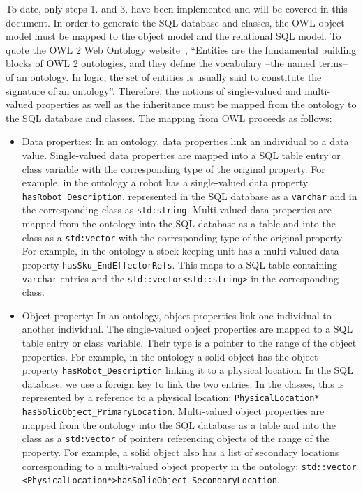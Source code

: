To date, only steps 1. and 3. have been implemented and will be covered in this document. In order to generate the SQL database and {\cpp} classes, the OWL object model must be mapped to the {\cpp} object model and the relational SQL model.  To quote the OWL 2 Web Ontology website~\cite{OWLspec}, ``Entities are the fundamental building blocks of OWL 2 ontologies, 
and they define the vocabulary --the named terms-- of an ontology. In logic, the set of entities is usually said to constitute the 
signature of an ontology''. Therefore, the notions of single-valued and multi-valued properties as well as the inheritance must be 
mapped from the ontology to the SQL database and {\cpp} classes. The mapping from OWL proceeds as follows:
\begin{itemize}
\item Data properties: In an ontology, data properties link an individual to a data value. Single-valued data properties are mapped into a SQL table entry or {\cpp} class
variable with the corresponding type of the original property. For example, in the ontology a robot has a single-valued data 
property \texttt{hasRobot\_Description}, represented in the
SQL database as a \texttt{varchar} and in the corresponding {\cpp} class as \texttt{std:string}. 
Multi-valued data properties are mapped from the ontology into the SQL database as a table and into the {\cpp} class as a \texttt{std:vector} with the corresponding
type of the original property. For example,
in the ontology a stock keeping unit has a multi-valued
data property \texttt{hasSku\_EndEffectorRefs}. This maps to a SQL table containing \texttt{varchar} entries and the {\cpp}
\texttt{std::vector\textless std::string\textgreater} in the corresponding {\cpp} class.

\item Object property: In an ontology, object properties link one individual to another individual. 
The single-valued object properties are mapped to a SQL table entry or {\cpp} class
variable. Their type is a pointer to the range of the object properties. For example, in the ontology a solid object has the object property \texttt{hasRobot\_Description} 
linking it to a physical location. In the SQL database, we use a foreign key to link the two entries. In the {\cpp} classes, this is represented by a reference to a physical location: \texttt{PhysicalLocation* hasSolidObject\_PrimaryLocation}.
Multi-valued object properties are mapped from the ontology into the SQL database as a table and into the {\cpp} class as a \texttt{std:vector} of pointers referencing objects of the range of the property.  For example, a solid object also has a list of secondary locations corresponding to a multi-valued object property in the ontology: {\scriptsize\texttt{std::vector\\ \textless PhysicalLocation*\textgreater hasSolidObject\_SecondaryLocation}}.
\end{itemize}

